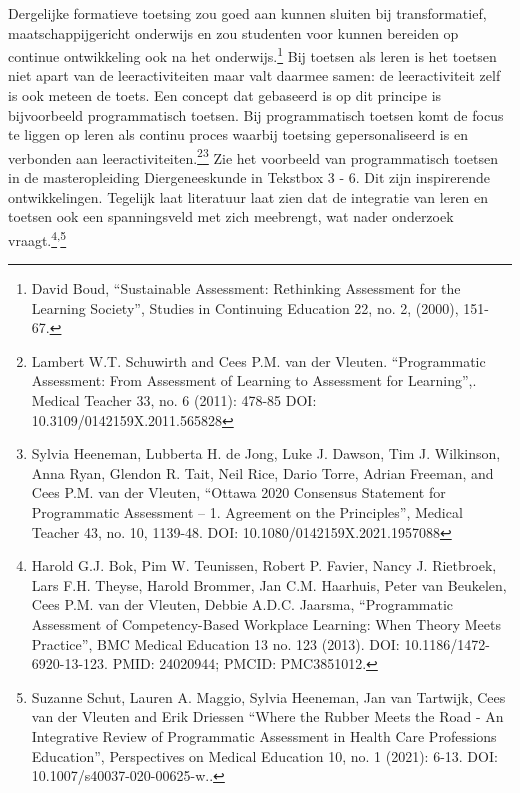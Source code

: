 \documentclass{jote-book}
\begin{document}
Dergelijke formatieve toetsing zou goed aan kunnen sluiten bij transformatief, maatschappijgericht onderwijs en zou studenten voor kunnen bereiden op continue ontwikkeling ook na het onderwijs.\footnote{David Boud, “Sustainable Assessment: Rethinking Assessment for the Learning Society”, Studies in Continuing Education 22, no. 2, (2000), 151-67.} Bij toetsen als leren is het toetsen niet apart van de leeractiviteiten maar valt daarmee samen: de leeractiviteit zelf is ook meteen de toets. Een concept dat gebaseerd is op dit principe is bijvoorbeeld programmatisch toetsen. Bij programmatisch toetsen komt de focus te liggen op leren als continu proces waarbij toetsing gepersonaliseerd is en verbonden aan leeractiviteiten.\footnote{Lambert W.T. Schuwirth and Cees P.M. van der Vleuten. “Programmatic Assessment: From Assessment of Learning to Assessment for Learning”,. Medical Teacher 33, no. 6 (2011): 478-85 DOI: 10.3109/0142159X.2011.565828}\footnote{Sylvia Heeneman, Lubberta H. de Jong, Luke J. Dawson, Tim J. Wilkinson, Anna Ryan, Glendon R. Tait, Neil Rice, Dario Torre, Adrian Freeman, and Cees P.M. van der Vleuten, “Ottawa 2020 Consensus Statement for Programmatic Assessment -- 1. Agreement on the Principles”, Medical Teacher 43, no. 10, 1139-48. DOI: 10.1080/0142159X.2021.1957088} Zie het voorbeeld van programmatisch toetsen in de masteropleiding Diergeneeskunde in Tekstbox 3 - 6. Dit zijn inspirerende ontwikkelingen. Tegelijk laat literatuur laat zien dat de integratie van leren en toetsen ook een spanningsveld met zich meebrengt, wat nader onderzoek vraagt.\footnote{Harold G.J. Bok, Pim W. Teunissen, Robert P. Favier, Nancy J. Rietbroek, Lars F.H. Theyse, Harold Brommer, Jan C.M. Haarhuis, Peter van Beukelen, Cees P.M. van der Vleuten, Debbie A.D.C. Jaarsma, “Programmatic Assessment of Competency-Based Workplace Learning: When Theory Meets Practice”, BMC Medical Education 13 no. 123 (2013). DOI: 10.1186/1472-6920-13-123. PMID: 24020944; PMCID: PMC3851012.}\textsuperscript{,}\footnote{Suzanne Schut, Lauren A. Maggio, Sylvia Heeneman, Jan van Tartwijk, Cees van der Vleuten and Erik Driessen “Where the Rubber Meets the Road - An Integrative Review of Programmatic Assessment in Health Care Professions Education”, Perspectives on Medical Education 10, no. 1 (2021): 6-13. DOI: 10.1007/s40037-020-00625-w..}
\end{document}
